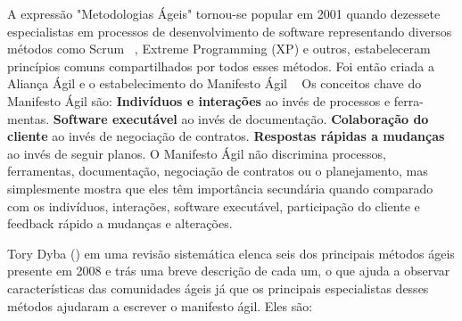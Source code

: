 A expressão "Metodologias Ágeis" tornou-se popular em 2001 quando dezessete especialistas em processos de desenvolvimento de software representando diversos métodos como Scrum ~\cite{schwaber2002},
Extreme Programming (XP) e outros, estabeleceram princípios comuns compartilhados por todos esses métodos. Foi então criada a Aliança Ágil e o estabelecimento do Manifesto Ágil ~\cite{manifesto2013}
Os conceitos chave do Manifesto Ágil são:
\textbf{Indivíduos e interações} ao invés de processos e ferra-
mentas.
\textbf{Software executável} ao invés de documentação.
\textbf{Colaboração do cliente} ao invés de negociação de contratos.
\textbf{Respostas rápidas a mudanças} ao invés de seguir planos.
O Manifesto Ágil não discrimina processos, ferramentas, documentação, negociação de contratos ou o planejamento, mas simplesmente mostra que eles têm importância secundária quando comparado com os indivíduos, interações, software executável, participação do cliente e feedback rápido a mudanças e alterações.

%
Tory Dyba (\citeyear{dyba2008}) em uma revisão sistemática elenca seis dos principais métodos ágeis presente em 2008 e trás uma breve descrição de cada um, o que ajuda a observar características das comunidades ágeis já que os principais especialistas desses métodos ajudaram a escrever o manifesto ágil. Eles são:

